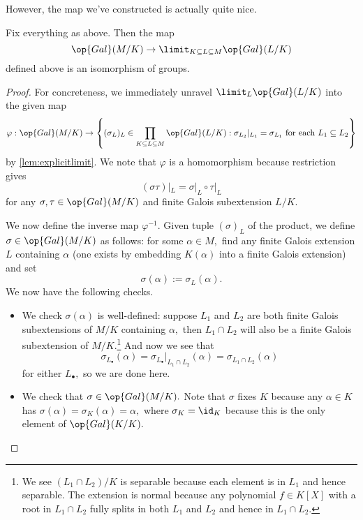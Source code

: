 \documentclass[../notes.tex]{subfiles}
\begin{document}
However, the map we've constructed is actually quite nice.
\begin{proposition}
	Fix everything as above. Then the map
	\[\op{Gal}(M/K)\to\limit_{K\subseteq L\subseteq M}\op{Gal}(L/K)\]
	defined above is an isomorphism of groups.
\end{proposition}
\begin{proof}
	For concreteness, we immediately unravel $\limit_L\op{Gal}(L/K)$ into the given map
	\[\varphi:\op{Gal}(M/K)\to\left\{(\sigma_L)_L\in\prod_{K\subseteq L\subseteq M}\op{Gal}(L/K):\sigma_{L_2}|_{L_1}=\sigma_{L_1}\text{ for each }L_1\subseteq L_2\right\}\]
	by \autoref{lem:explicitlimit}. We note that $\varphi$ is a homomorphism because restriction gives
	\[(\sigma\tau)|_L=\sigma|_L\circ\tau|_L\]
	for any $\sigma,\tau\in\op{Gal}(M/K)$ and finite Galois subextension $L/K.$

	We now define the inverse map $\varphi^{-1}.$ Given tuple $(\sigma)_L$ of the product, we define $\sigma\in\op{Gal}(M/K)$ as follows: for some $\alpha\in M,$ find any finite Galois extension $L$ containing $\alpha$ (one exists by embedding $K(\alpha)$ into a finite Galois extension) and set
	\[\sigma(\alpha):=\sigma_L(\alpha).\]
	We now have the following checks.
	\begin{itemize}
		\item We check $\sigma(\alpha)$ is well-defined: suppose $L_1$ and $L_2$ are both finite Galois subextensions of $M/K$ containing $\alpha,$ then $L_1\cap L_2$ will also be a finite Galois subextension of $M/K.$\footnote{We see $(L_1\cap L_2)/K$ is separable because each element is in $L_1$ and hence separable. The extension is normal because any polynomial $f\in K[X]$ with a root in $L_1\cap L_2$ fully splits in both $L_1$ and $L_2$ and hence in $L_1\cap L_2.$} And now we see that
		\[\sigma_{L_\bullet}(\alpha)=\sigma_{L_\bullet}|_{L_1\cap L_2}(\alpha)=\sigma_{L_1\cap L_2}(\alpha)\]
		for either $L_\bullet,$ so we are done here.
		\item We check that $\sigma\in\op{Gal}(M/K).$ Note that $\sigma$ fixes $K$ because any $\alpha\in K$ has $\sigma(\alpha)=\sigma_K(\alpha)=\alpha,$ where $\sigma_K=\id_K$ because this is the only element of $\op{Gal}(K/K).$
		

\end{itemize}
\end{proof}
\end{document}
